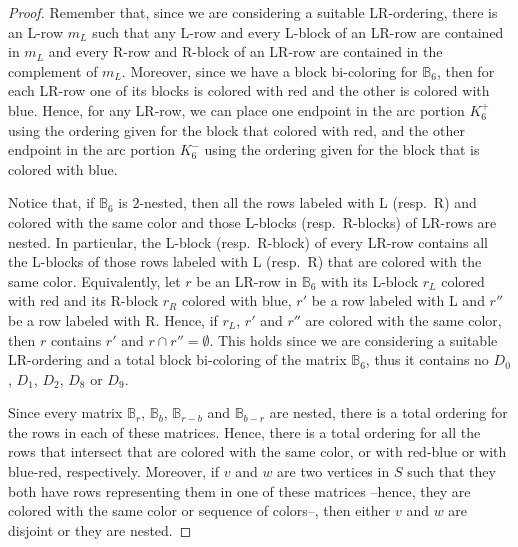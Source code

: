 \documentclass[12pt]{book}
\theoremstyle{plain}
\theoremstyle{remark}
\begin{document}
\begin{proof}
Remember that, since we are considering a suitable LR-ordering, there is an L-row $m_L$ such that any L-row and every L-block of an LR-row are contained in $m_L$ and every R-row and R-block of an LR-row are contained in the complement of $m_L$. Moreover, since we have a block bi-coloring for $\mathbb B_6$, then for each LR-row one of its blocks is colored with red and the other is colored with blue. 
Hence, for any LR-row, we can place one endpoint in the arc portion $K^+_6$ using the ordering given for the block that colored with red, and the other endpoint in the arc portion $K^-_6$ using the ordering given for the block that is colored with blue.

Notice that, if $\mathbb B_6$ is $2$-nested, then all the rows labeled with L (resp.\ R) and colored with the same color and those L-blocks (resp.\ R-blocks) of LR-rows are nested. In particular, the L-block (resp.\ R-block) of every LR-row contains all the L-blocks of those rows labeled with L (resp.\ R) that are colored with the same color. 
Equivalently, let $r$ be an LR-row in $\mathbb B_6$ with its L-block $r_L$ colored with red and its R-block $r_R$ colored with blue, $r'$ be a row labeled with L and $r''$ be a row labeled with R. Hence, if $r_L$, $r'$ and $r''$ are colored with the same color, then $r$ contains $r'$ and $r \cap r'' = \emptyset$. This holds since we are considering a suitable LR-ordering and a total block bi-coloring of the matrix $\mathbb B_6$, thus it contains no $D_0$, $D_1$, $D_2$, $D_8$ or $D_9$.

Since every matrix $\mathbb B_r$, $\mathbb B_b$, $\mathbb B_{r-b}$ and $\mathbb B_{b-r}$ are nested, there is a total ordering for the rows in each of these matrices. Hence, there is a total ordering for all the rows that intersect that are colored with the same color, or with red-blue or with blue-red, respectively. Moreover, if $v$ and $w$ are two vertices in $S$ such that they both have rows representing them in one of these matrices --hence, they are colored with the same color or sequence of colors--, then either $v$ and $w$ are disjoint or they are nested. 



\end{proof}
\end{document}

